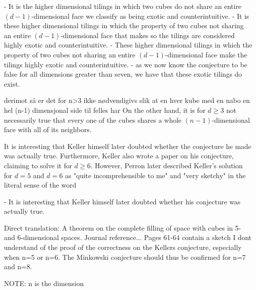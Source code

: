 - It is the higher dimensional tilings in which two cubes do not share an entire $(d-1)$-dimensional face we classify as being exotic and counterintuitive.
- It is these higher dimensional tilings in which the property of two cubes not sharing an entire $(d-1)$-dimensional face that makes so the tilings are considered highly exotic and counterintuitive. 
- These higher dimensional tilings in which the property of two cubes not sharing an entire $(d-1)$-dimensional face make the tilings highly exotic and counterintuitive. 
- as we now know the conjecture to be false for all dimensions greater than seven, we have that these exotic tilings do exist. 




derimot så er det for n>3 ikke nødvendigivs slik at en hver kube med en nabo en hel (n-1) dimensjonal side til felles har 
On the other hand, it is for $d\geq 3$ not necessarily true that every one of the cubes shares a whole $(n-1)$-dimensional face with all of its neighbors.

It is interesting that Keller himself later doubted whether the conjecture he made was actually true. 
Furthermore, Keller also wrote a paper on his conjecture, claiming to solve it for $d\geq 6$. 
However, Perron later described Keller's solution for $d=5$ and $d=6$ as "quite incomprehensible to me" and "very sketchy" in the 
literal sense of the word \cite{perronUeberLueckenloseAusfuellung1940}

- It is interesting that Keller himself later doubted whether his conjecture was actually true.


Direct translation:
A theorem on the complete filling of space with cubes in 5- and 6-dimensional spaces. Journal reference... Pages 61-64 contain a sketch I dont understand of the proof of the correctness on the Kellers conjecture, especially when n=5 or n=6. The Minkowski conjecture should thus be confirmed for n=7 and n=8.

NOTE: n is the dimension